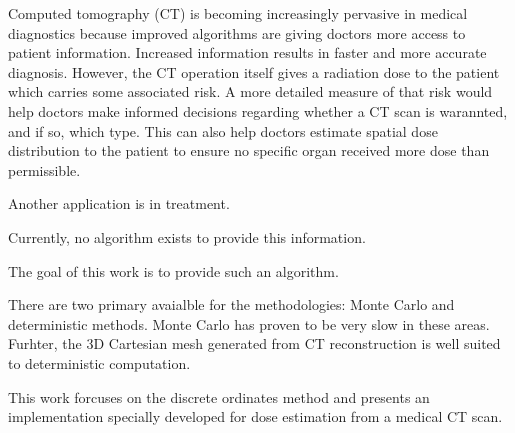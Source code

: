 

Computed tomography (CT) is becoming increasingly pervasive in medical diagnostics because improved algorithms are giving doctors more access to patient information. Increased information results in faster and more accurate diagnosis. However, the CT operation itself gives a radiation dose to the patient which carries some associated risk. A more detailed measure of that risk would help doctors make informed decisions regarding whether a CT scan is warannted, and if so, which type. This can also help doctors estimate spatial dose distribution to the patient to ensure no specific organ received more dose than permissible.

Another application is in treatment.

Currently, no algorithm exists to provide this information.

The goal of this work is to provide such an algorithm.

There are two primary avaialble for the methodologies: Monte Carlo and deterministic methods. Monte Carlo has proven to be very slow in these areas. Furhter, the 3D Cartesian mesh generated from CT reconstruction is well suited to deterministic computation. 

This work forcuses on the discrete ordinates method and presents an implementation specially developed for dose estimation from a medical CT scan. 

\endinput

